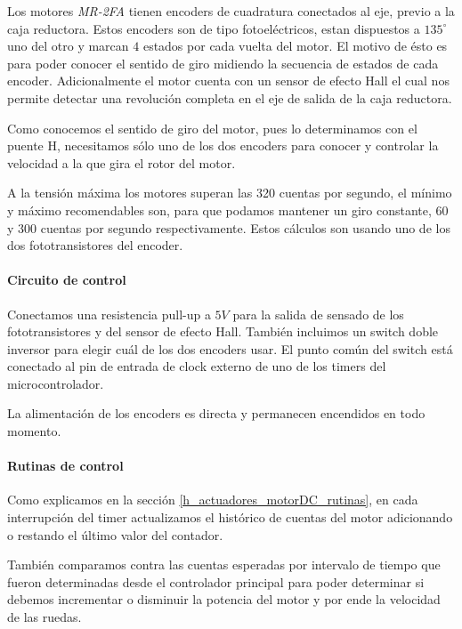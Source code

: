 Los motores \emph{MR-2FA} tienen encoders de cuadratura conectados al eje, previo a la caja reductora.
Estos encoders son de tipo fotoel\'ectricos, estan dispuestos a $135^{\circ}$ uno del otro y marcan $4$ estados por
cada vuelta del motor.
El motivo de \'esto es para poder conocer el sentido de giro midiendo la secuencia de estados de cada encoder.
Adicionalmente el motor cuenta con un sensor de efecto Hall el cual nos permite detectar una revoluci\'on completa
en el eje de salida de la caja reductora.

Como conocemos el sentido de giro del motor, pues lo determinamos con el puente H, necesitamos s\'olo
uno de los dos encoders para conocer y controlar la velocidad a la que gira el rotor del motor.

A la tensi\'on m\'axima los motores superan las 320 cuentas por segundo, el m\'inimo y m\'aximo recomendables
son, para que podamos mantener un giro constante, $60$ y $300$ cuentas por segundo respectivamente.
Estos c\'alculos son usando uno de los dos fototransistores del encoder.

\paragraph{Circuito de control}
\label{h_sensado_encoder_circuito}

Conectamos una resistencia pull-up a $5V$ para la salida de sensado de los fototransistores y del
sensor de efecto Hall.
Tambi\'en incluimos un switch doble inversor para elegir cu\'al de los dos encoders usar.
El punto com\'un del switch est\'a conectado al pin de entrada de clock externo de uno de los timers del
microcontrolador.

La alimentaci\'on de los encoders es directa y permanecen encendidos en todo momento.

\paragraph{Rutinas de control}
\label{h_sensado_encoder_rutinas}

Como explicamos en la secci\'on \ref{h_actuadores_motorDC_rutinas}, en cada interrupci\'on del timer actualizamos
el hist\'orico de cuentas del motor adicionando o restando el \'ultimo valor del contador.

Tambi\'en comparamos contra las cuentas esperadas por intervalo de tiempo que fueron determinadas desde el controlador
principal para poder determinar si debemos incrementar o disminuir la potencia del motor y por ende la velocidad de las ruedas.


